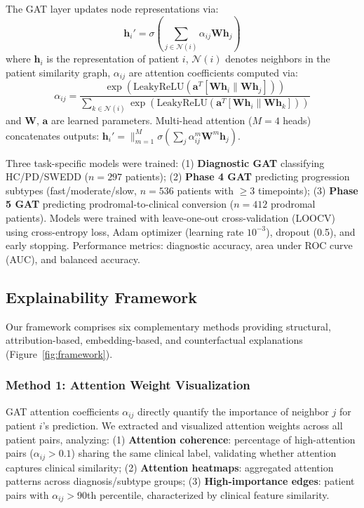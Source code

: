 The GAT layer updates node representations via:
\begin{equation}
\mathbf{h}_i' = \sigma \left( \sum_{j \in \mathcal{N}(i)} \alpha_{ij} \mathbf{W} \mathbf{h}_j \right)
\end{equation}
where $\mathbf{h}_i$ is the representation of patient $i$, $\mathcal{N}(i)$ denotes neighbors in the patient similarity graph, $\alpha_{ij}$ are attention coefficients computed via:
\begin{equation}
\alpha_{ij} = \frac{\exp(\text{LeakyReLU}(\mathbf{a}^T [\mathbf{W}\mathbf{h}_i \| \mathbf{W}\mathbf{h}_j]))}{\sum_{k \in \mathcal{N}(i)} \exp(\text{LeakyReLU}(\mathbf{a}^T [\mathbf{W}\mathbf{h}_i \| \mathbf{W}\mathbf{h}_k]))}
\end{equation}
and $\mathbf{W}$, $\mathbf{a}$ are learned parameters. Multi-head attention ($M=4$ heads) concatenates outputs: $\mathbf{h}_i' = \|_{m=1}^M \sigma(\sum_j \alpha_{ij}^m \mathbf{W}^m \mathbf{h}_j)$.

Three task-specific \giman{} models were trained: (1) \textbf{Diagnostic GAT} classifying HC/PD/SWEDD ($n=297$ patients); (2) \textbf{Phase 4 GAT} predicting progression subtypes (fast/moderate/slow, $n=536$ patients with $\geq$3 timepoints); (3) \textbf{Phase 5 GAT} predicting prodromal-to-clinical conversion ($n=412$ prodromal patients). Models were trained with leave-one-out cross-validation (LOOCV) using cross-entropy loss, Adam optimizer (learning rate $10^{-3}$), dropout (0.5), and early stopping. Performance metrics: diagnostic accuracy, area under ROC curve (AUC), and balanced accuracy.

\subsection{Explainability Framework}

Our framework comprises six complementary methods providing structural, attribution-based, embedding-based, and counterfactual explanations (Figure~\ref{fig:framework}).

\subsubsection{Method 1: Attention Weight Visualization}

GAT attention coefficients $\alpha_{ij}$ directly quantify the importance of neighbor $j$ for patient $i$'s prediction\cite{veličković2018graph}. We extracted and visualized attention weights across all patient pairs, analyzing: (1) \textbf{Attention coherence}: percentage of high-attention pairs ($\alpha_{ij} > 0.1$) sharing the same clinical label, validating whether attention captures clinical similarity; (2) \textbf{Attention heatmaps}: aggregated attention patterns across diagnosis/subtype groups; (3) \textbf{High-importance edges}: patient pairs with $\alpha_{ij} > 90$th percentile, characterized by clinical feature similarity.

